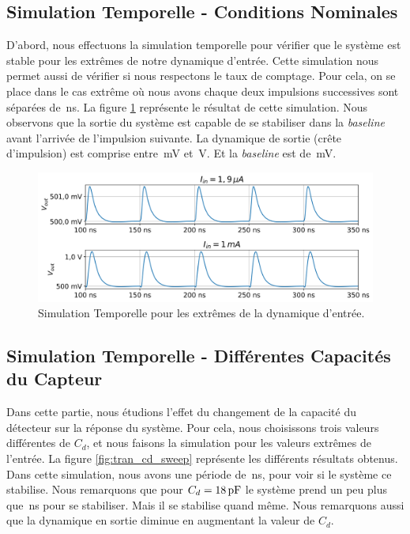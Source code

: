 \documentclass[a4paper,12pt]{article}
\numberwithin{equation}{section}
\newcommand{\?}{\stackrel{?}{=}}
\newcommand{\sis}[2]{\complexnum{#1}\,\si[per-mode=symbol]{#2}}
\begin{document}
\subsection{Simulation Temporelle - Conditions Nominales}

D'abord, nous effectuons la simulation temporelle pour vérifier que le système est stable pour les extrêmes de notre dynamique d'entrée. Cette simulation nous permet aussi de vérifier si nous respectons le taux de comptage. Pour cela, on se place dans le cas extrême où nous avons chaque deux impulsions successives sont séparées de \sis{50}{\nano\second}. La figure \ref{fig:tran} représente le résultat de cette simulation. Nous observons que la sortie du système est capable de se stabiliser dans la \textit{baseline} avant l'arrivée de l'impulsion suivante. La dynamique de sortie (crête d'impulsion) est comprise entre \sis{502.03}{\milli\volt} et \sis{1.0859}{\volt}. Et la \textit{baseline} est de \sis{500}{\milli\volt}.

\begin{figure}[htp!]
    \includegraphics[width=\linewidth]{images/tran.png}
    \caption{Simulation Temporelle pour les extrêmes de la dynamique d'entrée.}
    \label{fig:tran}
    \centering
\end{figure}

\subsection{Simulation Temporelle - Différentes Capacités du Capteur}

Dans cette partie, nous étudions l'effet du changement de la capacité du détecteur sur la réponse du système. Pour cela, nous choisissons trois valeurs différentes de $C_d$, et nous faisons la simulation pour les valeurs extrêmes de l'entrée. La figure \ref{fig:tran_cd_sweep} représente les différents résultats obtenus. Dans cette simulation, nous avons une période de \sis{100}{\nano\second}, pour voir si le système ce stabilise. Nous remarquons que pour $C_d = \sis{18}{\pico\farad}$ le système prend un peu plus que \sis{50}{\nano\second} pour se stabiliser. Mais il se stabilise quand même. Nous remarquons aussi que la dynamique en sortie diminue en augmentant la valeur de $C_d$.
\end{document}
